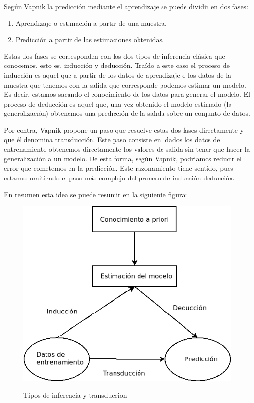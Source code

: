 Según Vapnik \cite{vapnik_v._nature_nodate} la predicción mediante el aprendizaje se puede dividir en dos fases:

\begin{enumerate}
	\item Aprendizaje o estimación a partir de una muestra.
	\item Predicción a partir de las estimaciones obtenidas.
\end{enumerate}

Estas dos fases se corresponden con los dos tipos de inferencia clásica que conocemos, esto es, inducción y deducción. Traído a este caso el proceso de inducción es aquel que a partir de los datos de aprendizaje o los datos de la muestra que tenemos con la salida que corresponde podemos estimar un modelo. Es decir, estamos sacando el conocimiento de los datos para generar el modelo. El proceso de deducción es aquel que, una vez obtenido el modelo estimado (la generalización) obtenemos una predicción de la salida sobre un conjunto de datos.

Por contra, Vapnik propone un paso que resuelve estas dos fases directamente y que él denomina transducción. Este paso consiste en, dados los datos de entrenamiento obtenemos directamente los valores de salida sin tener que hacer la generalización a un modelo. De esta forma, según Vapnik, podríamos reducir el error que cometemos en la predicción. Este razonamiento tiene sentido, pues estamos omitiendo el paso más complejo del proceso de inducción-deducción.

En resumen esta idea se puede resumir en la siguiente figura:

\begin{figure}[H]
	\centering
	\includegraphics[scale=0.5]{imagenes/induccion_deduccion_transduccion}
	\label{ind_ded_trans}
	\caption{Tipos de inferencia y transduccion \cite[p.~41]{cherkassky_learning_2007}}
\end{figure}

